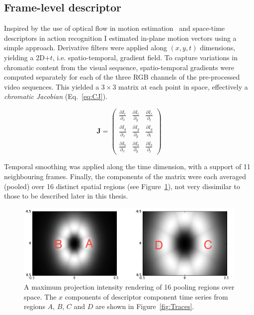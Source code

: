 \subsection{Frame-level descriptor}

Inspired by the use of optical flow in motion estimation~\citep{Weickert2006} and space-time descriptors in action recognition \citep{Wang2009} I estimated in-plane motion vectors using a simple approach.  Derivative filters were applied along $(x,y,t)$ dimensions, yielding a 2D$+t$, i.e. spatio-temporal, gradient field.  To capture variations in chromatic content from the visual sequence, spatio-temporal gradients were computed separately for each of the three RGB channels of the pre-processed video sequences.  This yielded a $3\times 3$ matrix at each point in space, effectively a \textit{chromatic Jacobian} (Eq.~\ref{eq:CJ}).  

\begin{equation}
\mathbf{J} = \left (
\begin{array}{ccc}
\frac{\partial I_r}{\partial_x} & \frac{\partial I_r}{\partial_y}   & \frac{\partial I_r}{\partial_t} \\
\frac{\partial I_g}{\partial_x}   & \frac{\partial I_g}{\partial_y}  &  \frac{\partial I_g}{\partial_t} \\
\frac{\partial I_b}{\partial_x}  & \frac{\partial  I_b}{\partial_y}  &  \frac{\partial I_b}{\partial_t} 
\end{array} 
\right )
\label{eq:CJ}
\end{equation}

Temporal smoothing was applied along the time dimension, with a support of 11 neighbouring frames. Finally, the components of the matrix were each averaged (pooled) over 16 distinct spatial regions (see Figure~\ref{fig:pooling4lwcolor}), not very dissimilar to those to be described later in this thesis. 



\begin{figure}[h!]
\centering
\includegraphics[width=\linewidth]{./gfx/Chapter04/pooling_lwcolor.png}
\caption{A maximum projection intensity rendering of 16 pooling regions over space. The $x$ components of descriptor component time series from regions $A$, $B$, $C$ and $D$ are shown in Figure~\ref{fig:Traces}.}
\label{fig:pooling4lwcolor}
\end{figure}



